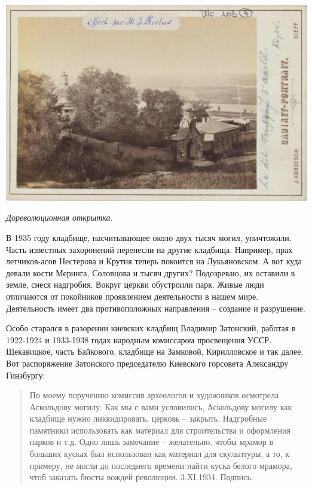 \begin{center}
\includegraphics[width=\linewidth]{chast-volga/oskoldidir/amog.jpg}

\textit{Дореволюционная открытка.}
\end{center}

В 1935 году кладбище, насчитывающее около двух тысяч могил, уничтожили. Часть известных захоронений перенесли на другие кладбища. Например, прах летчиков-асов Нестерова и Крутня теперь покоится на Лукьяновском. А вот куда девали кости Меринга, Соловцова и тысяч других? Подозреваю, их оставили в земле, снеся надгробия. Вокруг церкви обустроили парк. Живые люди отличаются от покойников проявлением деятельности в нашем мире. Деятельность имеет два противоположных направления – создание и разрушение.

Особо старался в разорении киевских кладбищ Владимир Затонский, работая в 1922-1924 и 1933-1938 годах народным комиссаром просвещения УССР. Щекавицкое, часть Байкового, кладбище на Замковой, Кирилловское и так далее. Вот распоряжение Затонского председателю Киевского горсовета Александру Гинзбургу:

\begin{quotation}
По моему поручению комиссия археологов и художников осмотрела Аскольдову могилу. Как мы с вами условились, Аскольдову могилу как кладбище нужно ликвидировать, церковь – закрыть. Надгробные памятники использовать как материал для строительства и оформления парков и т.д. Одно лишь замечание – желательно, чтобы мрамор в больших кусках был использован как материал для скульптуры, а то, к примеру, не могли до последнего времени найти куска белого мрамора, чтоб заказать бюсты вождей революции. 3.ХI.1934. Подпись.
\end{quotation}

